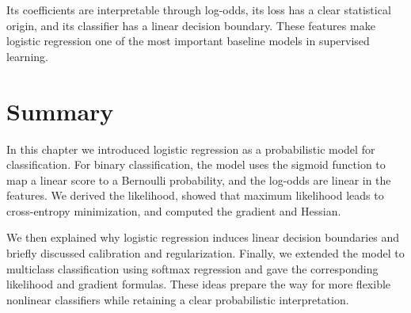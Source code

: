 Its coefficients are interpretable through log-odds, its loss has a clear statistical origin, and its classifier has a linear decision boundary. These features make logistic regression one of the most important baseline models in supervised learning.

\section{Summary}

In this chapter we introduced logistic regression as a probabilistic model for classification. For binary classification, the model uses the sigmoid function to map a linear score to a Bernoulli probability, and the log-odds are linear in the features. We derived the likelihood, showed that maximum likelihood leads to cross-entropy minimization, and computed the gradient and Hessian.

We then explained why logistic regression induces linear decision boundaries and briefly discussed calibration and regularization. Finally, we extended the model to multiclass classification using softmax regression and gave the corresponding likelihood and gradient formulas. These ideas prepare the way for more flexible nonlinear classifiers while retaining a clear probabilistic interpretation.